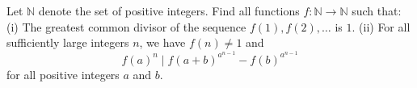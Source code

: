 Let $\mathbb N$ denote the set of positive integers. Find all functions $f: \mathbb{N} \to \mathbb{N}$ such that:
(i) The greatest common divisor of the sequence $f(1), f(2), \dots$ is $1$.
(ii) For all sufficiently large integers $n$, we have $f(n) \neq 1$ and  \[ f(a)^n \mid f(a+b)^{a^{n-1}} - f(b)^{a^{n-1}} \]  for all positive integers $a$ and $b$.

